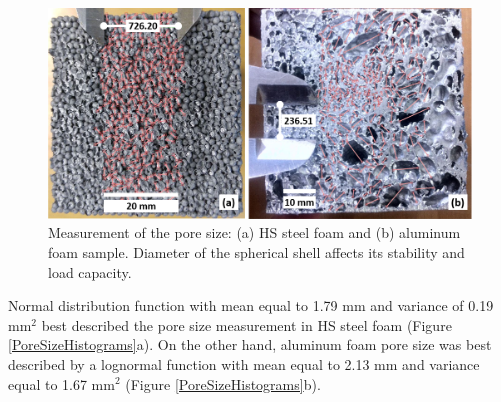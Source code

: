 \documentclass[review]{elsarticle}
\begin{document}
\begin{figure}[htbp]
	\begin{center}
		\includegraphics[width=0.80\linewidth]{Tex-Figures/Fig02a_b.png}
		\caption{Measurement of the pore size: (a) HS steel foam and (b) aluminum foam sample. Diameter of the spherical shell affects its stability and load capacity.}
		\label{PoreMeas}
	\end{center}
\end{figure}

Normal distribution function with mean equal to 1.79 mm and variance of 0.19 mm$^2$ best described the pore size measurement in HS steel foam (Figure \ref{PoreSizeHistograms}a). On the other hand, aluminum foam pore size was best described by a lognormal function with mean equal to 2.13 mm and variance equal to 1.67 mm$^2$ (Figure \ref{PoreSizeHistograms}b).
\end{document}
